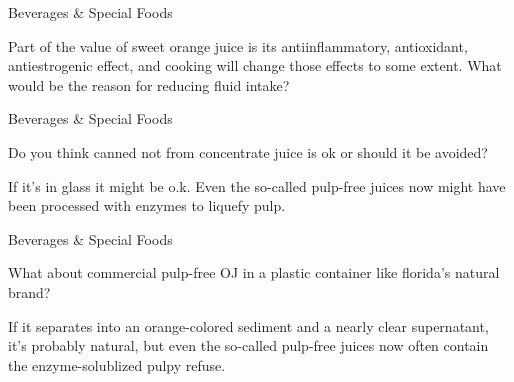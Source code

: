 \documentclass[11pt,oneside,openany,extrafontsizes]{memoir}
\begin{document}
\begin{standalonequote}{Beverages \& Special Foods}

    \begin{answer}
        Part of the value of sweet orange juice is its antiinflammatory, antioxidant, antiestrogenic effect, and cooking will change those effects to some extent. What would be the reason for reducing fluid intake?
    \end{answer}
\end{standalonequote}

\begin{qaexchange}{Beverages \& Special Foods}

    \begin{question}
        Do you think canned not from concentrate juice is ok or should it be avoided?
    \end{question}

    \begin{answer}
        If it's in glass it might be o.k. Even the so-called pulp-free juices now might have been processed with enzymes to liquefy pulp.
    \end{answer}
\end{qaexchange}

\begin{qaexchange}{Beverages \& Special Foods}

    \begin{question}
        What about commercial pulp-free OJ in a plastic container like florida's natural brand?
    \end{question}

    \begin{answer}
        If it separates into an orange-colored sediment and a nearly clear supernatant, it's probably natural, but even the so-called pulp-free juices now often contain the enzyme-solublized pulpy refuse.
    \end{answer}
\end{qaexchange}
\end{document}
